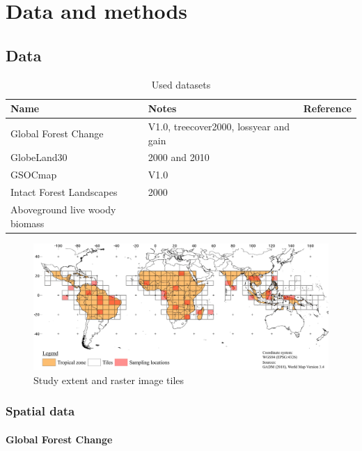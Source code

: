 \section{Data and methods}
\label{sec:datamethods}

\subsection{Data}
\label{subsec:data}

	\begin{table}[ht]
		\centering
		\caption[Used datasets]{Used datasets}
		\label{tab:datasets}
		\begin{tabular}{lll}
			\hline
			Name & Notes & Reference \\\hline
			Global Forest Change & V1.0, treecover2000, lossyear and gain & \\
			GlobeLand30 & 2000 and 2010 & \\
			GSOCmap & V1.0 & \\
			Intact Forest Landscapes & 2000 & \\
			Aboveground live woody biomass & & \\
		\end{tabular}
	\end{table}

	\begin{figure}[ht]
		\centering
		\includegraphics[scale=.97]{img/method_overview_frameless}
		\caption[Study extent]{Study extent and raster image tiles}
		\label{fig:studyextent}
	\end{figure}

	\subsubsection{Spatial data}
		\paragraph{Global Forest Change}
